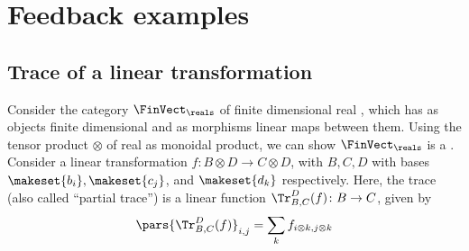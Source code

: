
\section{Feedback examples}
\publictodomessage

\subsection{Trace of a linear transformation}
\label{subsec:trace-linear}
Consider the category $\FinVect_\reals$ of finite dimensional real , which has as objects finite dimensional  and as morphisms linear maps between them.
Using the tensor product $\otimes$ of real  as monoidal product, we can show $\FinVect_\reals$ is a .
Consider a linear transformation $f\colon B\otimes D\to C\otimes D$, with $B,C,D$  with bases $\makeset{b_i},\makeset{c_j}$, and $\makeset{d_k}$ respectively.
Here, the trace (also called ``partial trace'') is a linear function $\Tr_{B,C}
    ^D(f)\colon B\to C$, given by
\begin{equation}
    \pars{\Tr_{B,C}
        ^D(f) }_{i,j}=\sum_{k}f_{i\otimes k,j\otimes k}
\end{equation}

